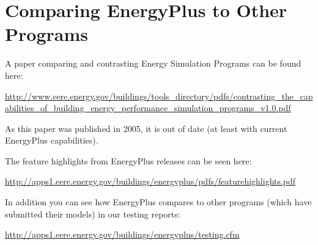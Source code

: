 \section{Comparing EnergyPlus to Other Programs}\label{comparing-energyplus-to-other-programs}

A paper comparing and contrasting Energy Simulation Programs can be found here:

\url{http://www.eere.energy.gov/buildings/tools_directory/pdfs/contrasting_the_capabilities_of_building_energy_performance_simulation_programs_v1.0.pdf}

As this paper was published in 2005, it is out of date (at least with current EnergyPlus capabilities).

The feature highlights from EnergyPlus releases can be seen here:

\url{http://apps1.eere.energy.gov/buildings/energyplus/pdfs/featurehighlights.pdf}

In addition you can see how EnergyPlus compares to other programs (which have submitted their models) in our testing reports:

\url{http://apps1.eere.energy.gov/buildings/energyplus/testing.cfm}
